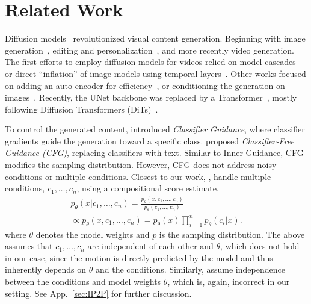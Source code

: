 \section{Related Work}
\label{sec:related}

Diffusion models~\cite{Ho2020DenoisingDP} revolutionized visual content generation. Beginning with image generation~\cite{dhariwal2021diffusion,rombach2021highresolution,ho2022imagen,flux,dai2023emu,dalle3}, editing and personalization~\cite{gal2022image,ruiz2023dreambooth,chefer2024still,emuedit,EVE,chefer2024the}, and more recently video generation.
The first efforts to employ diffusion models for videos relied on model cascades~\cite{ho2022imagenvid,singer2023makeavideo} or direct ``inflation'' of image models using temporal layers~\cite{guo2023animatediff,Lumiere,wu2023tune}. Other works focused on adding an auto-encoder for efficiency~\cite{Blattmann2023AlignYL,an2023latentshift,modelscope}, or conditioning the generation on images~\cite{sdvideo,2023i2vgenxl,xing2023dynamicrafter,emuvideo2023,hong2022cogvideo}. Recently, the UNet backbone was replaced by a Transformer~\cite{moviegen,sora,genmo2024mochi,gupta2023photorealistic,HaCohen2024LTXVideo}, mostly following Diffusion Transformers (DiTs)~\cite{dit}.

To control the generated content, \citet{dhariwal2021diffusion} introduced \emph{Classifier Guidance}, where classifier gradients guide the generation toward a specific class. \citet{ho2022classifier} proposed \emph{Classifier-Free Guidance (CFG)}, replacing classifiers with text. Similar to Inner-Guidance, CFG modifies the sampling distribution. However, CFG does not address noisy conditions or multiple conditions. Closest to our work, \citet{Liu2022CompositionalVG}, handle multiple conditions, $c_1,\dots, c_n$, using a compositional score estimate,
\begin{align*}
    p_\theta(x | c_1, \dots, c_n) = \frac{p_\theta(x,c_1, \dots, c_n)} {p_\theta (c_1,\dots, c_n)} \\ \propto p_\theta(x, c_1, \dots, c_n) = p_\theta(x) \prod_{i=1}^n p_\theta(c_i | x).
\end{align*}
where $\theta$ denotes the model weights and $p$ is the sampling distribution. The above assumes that $c_1, \dots, c_n$ are independent of each other and $\theta$, which does not hold in our case, since the motion is directly predicted by the model and thus inherently depends on $\theta$ and the conditions. Similarly, \citet{brooks2022instructpix2pix} assume independence between the conditions and model weights $\theta$, which is, again, incorrect in our setting. See App.~\ref{sec:IP2P} for further discussion.

